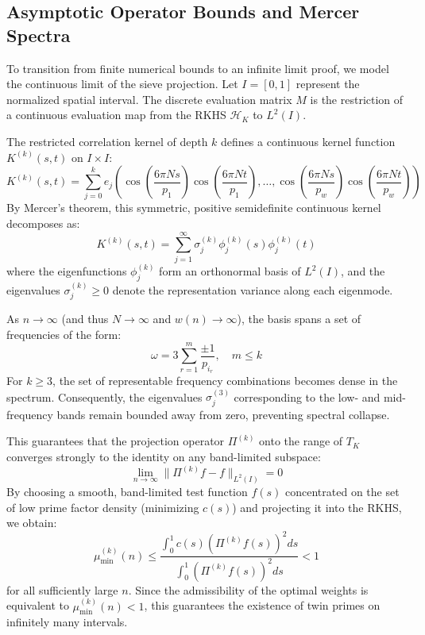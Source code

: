 \documentclass[10pt,twoside]{article}
\begin{document}
\subsection{Asymptotic Operator Bounds and Mercer Spectra}

To transition from finite numerical bounds to an infinite limit proof, we model the continuous limit of the sieve projection. Let $I = [0, 1]$ represent the normalized spatial interval. The discrete evaluation matrix $M$ is the restriction of a continuous evaluation map from the RKHS $\mathcal{H}_K$ to $L^2(I)$.

The restricted correlation kernel of depth $k$ defines a continuous kernel function $K^{(k)}(s, t)$ on $I \times I$:
\begin{equation}
K^{(k)}(s, t) = \sum_{j=0}^k e_j\left(\cos\left(\frac{6\pi N s}{p_1}\right)\cos\left(\frac{6\pi N t}{p_1}\right), \dots, \cos\left(\frac{6\pi N s}{p_w}\right)\cos\left(\frac{6\pi N t}{p_w}\right)\right)
\end{equation}
By Mercer's theorem, this symmetric, positive semidefinite continuous kernel decomposes as:
\begin{equation}
K^{(k)}(s, t) = \sum_{j=1}^\infty \sigma_j^{(k)} \phi_j^{(k)}(s) \phi_j^{(k)}(t)
\end{equation}
where the eigenfunctions $\phi_j^{(k)}$ form an orthonormal basis of $L^2(I)$, and the eigenvalues $\sigma_j^{(k)} \ge 0$ denote the representation variance along each eigenmode.

As $n \to \infty$ (and thus $N \to \infty$ and $w(n) \to \infty$), the basis spans a set of frequencies of the form:
\begin{equation}
\omega = 3 \sum_{r=1}^m \frac{\pm 1}{p_{i_r}}, \quad m \le k
\end{equation}
For $k \ge 3$, the set of representable frequency combinations becomes dense in the spectrum. Consequently, the eigenvalues $\sigma_j^{(3)}$ corresponding to the low- and mid-frequency bands remain bounded away from zero, preventing spectral collapse.

This guarantees that the projection operator $\Pi^{(k)}$ onto the range of $T_K$ converges strongly to the identity on any band-limited subspace:
\begin{equation}
\lim_{n \to \infty} \|\Pi^{(k)} f - f\|_{L^2(I)} = 0
\end{equation}
By choosing a smooth, band-limited test function $f(s)$ concentrated on the set of low prime factor density (minimizing $c(s)$) and projecting it into the RKHS, we obtain:
\begin{equation}
\mu_{\min}^{(k)}(n) \le \frac{\int_0^1 c(s) (\Pi^{(k)} f(s))^2 ds}{\int_0^1 (\Pi^{(k)} f(s))^2 ds} < 1
\end{equation}
for all sufficiently large $n$. Since the admissibility of the optimal weights is equivalent to $\mu_{\min}^{(k)}(n) < 1$, this guarantees the existence of twin primes on infinitely many intervals.
\end{document}

